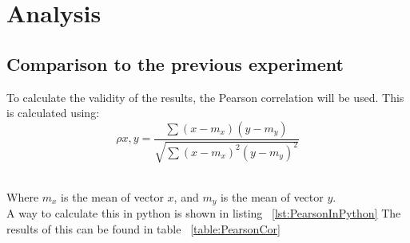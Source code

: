 



\section{Analysis}
\subsection{Comparison to the previous experiment}
To calculate the validity of the results, the Pearson correlation will be used. This is calculated using: \\

\begin{equation}
\rho x,y = \frac{\sum (x-m_{x})(y-m_{y})}{\sqrt{\sum(x-m_{x})^2(y-m_{y})^2}}
\end{equation}

~\\ Where $m_{x}$ is the mean of vector $x$, and $m_{y}$ is the mean of vector $y$.
~\\ A way to calculate this in python is shown in listing ~\ref{lst:PearsonInPython} The results of this can be found in table ~\ref{table:PearsonCor}

